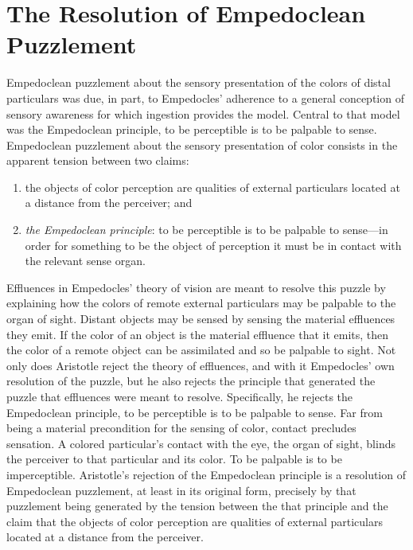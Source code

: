 
\section{The Resolution of Empedoclean Puzzlement} %
\label{sec:the_resolution_of_empedoclean_puzzlement}

Empedoclean puzzlement about the sensory presentation of the colors of distal particulars was due, in part, to Empedocles' adherence to a general conception of sensory awareness for which ingestion provides the model. Central to that model was the Empedoclean principle, to be perceptible is to be palpable to sense. Empedoclean puzzlement about the sensory presentation of color consists in the apparent tension between two claims:
\begin{enumerate}[(1)]
    \item the objects of color perception are qualities of external particulars located at a distance from the perceiver; and
    \item \emph{the Empedoclean principle}: to be perceptible is to be palpable to sense---in order for something to be the object of perception it must be in contact with the relevant sense organ.
\end{enumerate}
Effluences in Empedocles' theory of vision are meant to resolve this puzzle by explaining how the colors of remote external particulars may be palpable to the organ of sight. Distant objects may be sensed by sensing the material effluences they emit. If the color of an object is the material effluence that it emits, then the color of a remote object can be assimilated and so be palpable to sight. Not only does Aristotle reject the theory of effluences, and with it Empedocles' own resolution of the puzzle, but he also rejects the principle that generated the puzzle that effluences were meant to resolve. Specifically, he rejects the Empedoclean principle, to be perceptible is to be palpable to sense. Far from being a material precondition for the sensing of color, contact precludes sensation. A colored particular's contact with the eye, the organ of sight, blinds the perceiver to that particular and its color. To be palpable is to be imperceptible. Aristotle's rejection of the Empedoclean principle is a resolution of Empedoclean puzzlement, at least in its original form, precisely by that puzzlement being generated by the tension between the that principle and the claim that the objects of color perception are qualities of external particulars located at a distance from the perceiver.

